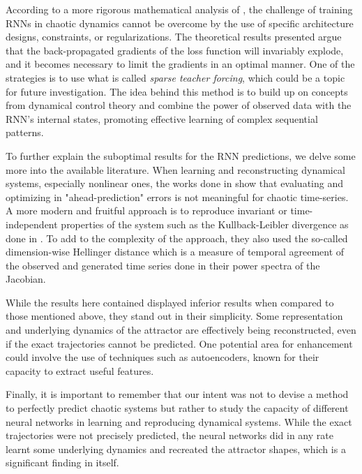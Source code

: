 According to a more rigorous mathematical analysis of \cite{mikhaeil2022difficulty}, the challenge of training RNNs in chaotic dynamics cannot be overcome by the use of specific architecture designs, constraints, or regularizations. The theoretical results presented argue that the back-propagated gradients of the loss function will invariably explode, and it becomes necessary to limit the gradients in an optimal manner. One of the strategies is to use what is called \emph{sparse teacher forcing}, which could be a topic for future investigation. The idea behind this method is to build up on concepts from dynamical control theory and combine the power of observed data with the RNN's internal states, promoting effective learning of complex sequential patterns.

To further explain the suboptimal results for the RNN predictions, we delve some more into the available literature. When learning and reconstructing dynamical systems, especially nonlinear ones, the works done in \cite{koppe2019identifying}\cite{wood2010statistical} show that evaluating and optimizing in "ahead-prediction" errors is not meaningful for chaotic time-series. A more modern and fruitful approach is to reproduce invariant or time-independent properties of the system such as the Kullback-Leibler divergence as done in \cite{mikhaeil2022difficulty}. To add to the complexity of the approach, they also used the so-called dimension-wise Hellinger distance which is a measure of temporal agreement of the observed and generated time series done in their power spectra of the Jacobian.

While the results here contained displayed inferior results when compared to those mentioned above, they stand out in their simplicity. Some representation and underlying dynamics of the attractor are effectively being reconstructed, even if the exact trajectories cannot be predicted. One potential area for enhancement could involve the use of techniques such as autoencoders,  known for their capacity to extract useful features. 

Finally, it is important to remember that our intent was not to devise a method to perfectly predict chaotic systems but rather to study the capacity of different neural networks in learning and reproducing dynamical systems. While the exact trajectories were not precisely predicted, the neural networks did in any rate learnt some underlying dynamics and recreated the attractor shapes, which is a significant finding in itself.











